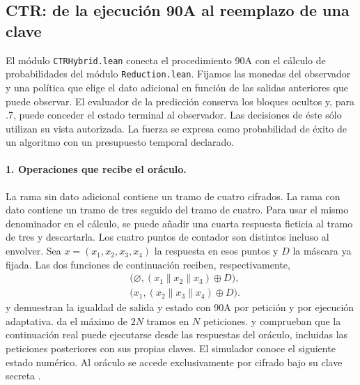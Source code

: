 \subsection{CTR: de la ejecución 90A al reemplazo de una clave}
\label{sec:ctr-hybrid-lean}
El módulo \nolinkurl{CTRHybrid.lean} conecta el procedimiento 90A
con el cálculo de probabilidades del módulo \nolinkurl{Reduction.lean}.
Fijamos las monedas del observador y una política que elige el dato
adicional en función de las salidas anteriores que puede observar. El
evaluador de la predicción conserva los bloques ocultos y, para .7,
puede conceder el estado terminal al observador. Las decisiones de éste
sólo utilizan su vista autorizada. La fuerza se expresa como probabilidad
de éxito de un algoritmo con un presupuesto temporal declarado.

\paragraph{1. Operaciones que recibe el oráculo.}
La rama sin dato adicional contiene un tramo de cuatro cifrados.
La rama con dato contiene un tramo de tres seguido del tramo de cuatro.
Para usar el mismo denominador en el cálculo, se puede añadir una cuarta
respuesta ficticia al tramo de tres y descartarla. Los cuatro puntos de
contador son distintos incluso al envolver. Sea \(x=(x_1,x_2,x_3,x_4)\)
la respuesta en esos puntos y \(D\) la máscara ya fijada. Las dos funciones
de continuación reciben, respectivamente,
\[
 \begin{aligned}
   &\bigl(\varnothing,(x_1\|x_2\|x_3)\oplus D\bigr),\\
   &\bigl(x_1,(x_2\|x_3\|x_4)\oplus D\bigr).
 \end{aligned}
\]
 y  demuestran
la igualdad de salida y estado con 90A por petición y por ejecución
adaptativa.  da el máximo de \(2N\)
tramos en \(N\) peticiones.  y
 comprueban que la continuación real puede
ejecutarse desde las respuestas del oráculo, incluidas las peticiones
posteriores con sus propias claves. El simulador conoce el siguiente
estado numérico. Al oráculo se accede exclusivamente por cifrado bajo su
clave secreta \cite[§§10.2.1.2 y 10.2.1.5.1]{nist90a}.

